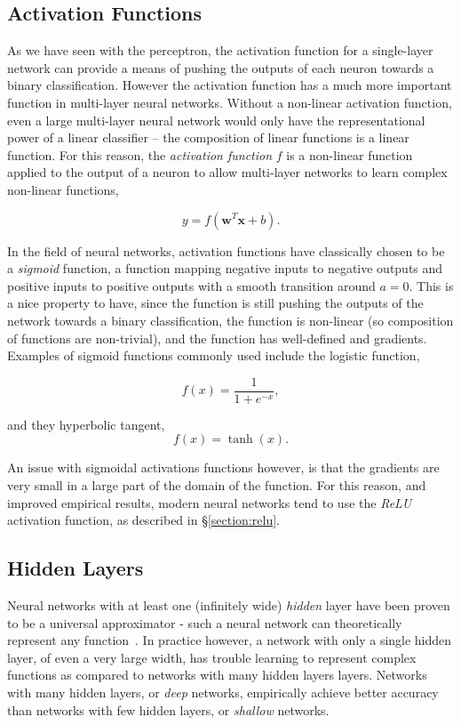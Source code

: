 \documentclass[thesis]{subfiles}
\begin{document}
 
\subsection{Activation Functions}
As we have seen with the perceptron, the activation function for a single-layer network can provide a means of pushing the outputs of each neuron towards a binary classification. However the activation function has a much more important function in multi-layer neural networks. Without a non-linear activation function, even a large multi-layer neural network would only have the representational power of a linear classifier -- the composition of linear functions is a linear function. For this reason, the \emph{activation function} $f$ is a non-linear function applied to the output of a neuron to allow multi-layer networks to learn complex non-linear functions,

\begin{equation}
y = f\left(\mathbf{w}^T\mathbf{x} + b\right).
\end{equation}

In the field of neural networks, activation functions have classically chosen to be a \emph{sigmoid} function, \ie a function mapping negative inputs to negative outputs and positive inputs to positive outputs with a smooth transition around $a = 0$. This is a nice property to have, since the function is still pushing the outputs of the network towards a binary classification, the function is non-linear (so composition of functions are non-trivial), and the function has well-defined and gradients. Examples of sigmoid functions commonly used include the logistic function, 

\begin{equation}
	f(x) = \frac{1}{1+e^{-x}},
\end{equation}

and they hyperbolic tangent,
\begin{equation}
	f(x) = \tanh(x).
\end{equation}

An issue with sigmoidal activations functions however, is that the gradients are very small in a large part of the domain of the function. For this reason, and improved empirical results, modern neural networks tend to use the \emph{ReLU} activation function, as described in \S\ref{section:relu}.


\subsection{Hidden Layers}
Neural networks with at least one (infinitely wide) \emph{hidden} layer have been proven to be a universal approximator - \ie such a neural network can theoretically represent any function~\citep{journals/mcss/Cybenko92,hornik89a}. In practice however, a network with only a single hidden layer, of even a very large width, has trouble learning to represent complex functions as compared to networks with many hidden layers layers. Networks with many hidden layers, or \emph{deep} networks, empirically achieve better accuracy than networks with few hidden layers, or \emph{shallow} networks.
\end{document}
